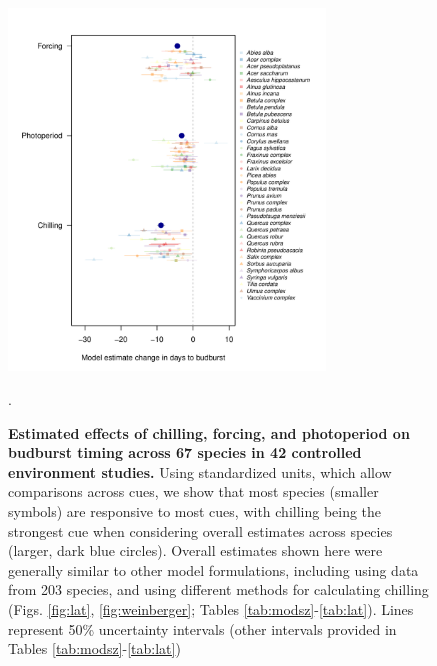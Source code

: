 \documentclass{article}
\begin{document}
\begin{figure}[h!]
\centering
\noindent \includegraphics[width=0.75\textwidth]{..//..//analyses/bb_analysis/figures/muplotspcompexprampfputah_z.pdf}
\caption{\textbf{Estimated effects of chilling, forcing, and photoperiod on budburst timing across 67 species in 42 controlled environment studies.} Using standardized units, which allow comparisons across cues, we show that most species (smaller symbols) are responsive to most cues, with chilling being the strongest cue when considering overall estimates across species (larger, dark blue circles). Overall estimates shown here were generally similar to other model formulations, including using data from 203 species, and using different methods for calculating chilling (Figs. \ref{fig:lat}, \ref{fig:weinberger}; Tables \ref{tab:modsz}-\ref{tab:lat}). Lines represent 50\% uncertainty intervals (other intervals provided in Tables \ref{tab:modsz}-\ref{tab:lat})}.
\label{fig:mu}
\end{figure}

\newpage
\end{document}
